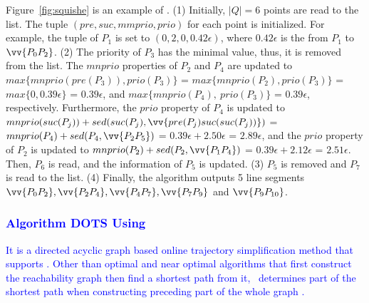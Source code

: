\begin{example}
	\label{exm-alg-squishe}
	Figure~\ref{fig:squishe} is an example of \squishe.
	(1) Initially, $|Q| = 6$ points are read to the list. The tuple $(pre, suc, mmprio, prio)$ for each point is initialized. For example, the tuple of $P_1$ is set to $(0, 2, 0, 0.42\epsilon)$, where $0.42\epsilon$ is the \sed from $P_1$ to $\vv{P_0P_2}$.
	(2) The priority of $P_3$ has the minimal value, thus, it is removed from the list.
	The $mnprio$ properties of $P_2$ and $P_4$ are updated to $max\{mnprio(pre(P_3)), prio(P_3)\}$ = $max\{mnprio(P_2), prio(P_3)\}$ = $max\{0, 0.39\epsilon\}$ = $0.39\epsilon$, and $max\{mnprio(P_4), ~prio(P_3)\}$ = $0.39\epsilon$, respectively.
	Furthermore, the $prio$ property of $P_4$ is updated to $mnprio(suc(P_j)) + sed(suc(P_j),\vv{pre(P_{j})suc(suc(P_{j}))})$ = $mnprio(P_4) + sed(P_4,\vv{P_2P_5})$ = $0.39\epsilon + 2.50\epsilon$ = $2.89\epsilon$, and the $prio$ property of $P_2$ is updated to $mnprio(P_2) + sed(P_2,\vv{P_1P_4})$ = $0.39\epsilon + 2.12\epsilon$ = $2.51\epsilon$.
	Then, $P_6$ is read, and the information of $P_5$ is updated.
	(3) $P_5$ is removed and $P_7$ is read to the list.
	(4) Finally, the algorithm outputs 5 line segments $\vv{P_0P_2},\vv{P_2P_4},\vv{P_4P_7},\vv{P_7P_9}$ and $\vv{P_9P_{10}}$.
\end{example}

\subsubsection{\textcolor{blue}{Algorithm DOTS Using \lissed~\cite{Cao:Dots}}}
\textcolor{blue}{It is a directed acyclic graph based online trajectory simplification method that supports \lissed. Other than optimal and near optimal algorithms \cite{Chen:Fast,Daescu:metric} that first construct the reachability graph then find a shortest path from it, \dagots~determines part of the shortest path when constructing preceding part of the whole graph \cite{Cao:Dots}.}

